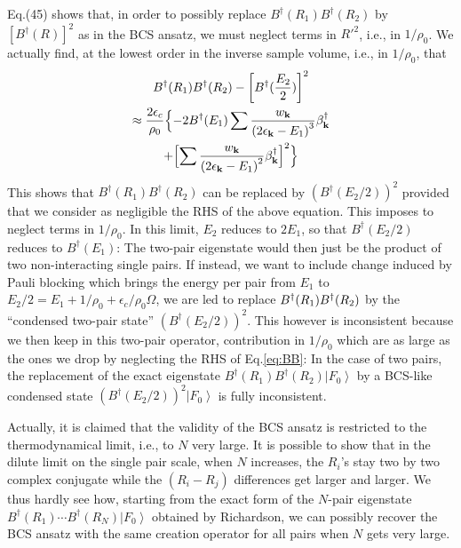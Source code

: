 \documentclass[aps,prb,superscriptaddress,showpacs,reprint,lengthcheck]{revtex4-1}
\newcommand{\vk}{\ensuremath{\mathbf{k}}}
\begin{document}
Eq.(45) shows that, in order to possibly replace $B^{\dagger}(R_1)B^{\dagger}(R_2)$ by $\left[B^{\dagger}(R)\right]
^2$ as in the BCS ansatz, we must neglect terms in $R'^2$, i.e., in $1/\rho_0$. We  actually find, at the lowest order in the inverse sample volume, i.e., in $1/\rho_0$, that
\begin{multline}  \label{eq:BB}
B^{\dagger}(R_1)B^{\dagger}(R_2)-\left[B^{\dagger}(\frac{E _2}{2})%
\right] ^2 \\
\approx \frac{2\epsilon_c}{\rho_0}\Bigl\{-2B^{\dagger}(E _1)\sum\frac{w_\vk}{\left(2\epsilon_\vk-%
E _1\right) ^3}\beta^{\dagger}_\vk\\ +\Bigl[\sum\frac{w_\vk}{%
\left(2\epsilon_\vk-E _1\right) ^2}\beta^{\dagger}_\vk\Bigr]
^2\Bigr\}  
\end{multline}
This shows that $B^{\dagger}(R_1)B^{\dagger}(R_2)$ can be
replaced by $\left(B^{\dagger}(E _2/2)\right) ^2$ provided that we
consider as negligible the RHS of the above equation. This imposes to neglect terms in $1/\rho_0$. 
In this limit, $E_2$ reduces to $2E_1$, so that $B^{\dagger}(E _2/2)$  reduces to $%
B^{\dagger}(E _1)$: The
two-pair eigenstate would then just be the product of two non-interacting single pairs. If
instead, we want to include
change induced by Pauli blocking which brings the
energy per pair from $E _1$ to $E _2/2=E
_1+1/\rho_0+\epsilon_c/\rho_0\Omega$, we are led to replace $B^{\dagger}(R_1)B^{%
\dagger}(R_2)$ by the ``condensed two-pair state'' $\left(B^{\dagger}(E _2/2)\right) ^2$. This
however is inconsistent because we then keep in this two-pair
operator, contribution in $1/\rho_0$ which are as large as the ones we drop
by neglecting the RHS of Eq.\eqref{eq:BB}: In the case of two pairs, the replacement of
the exact eigenstate $B^{\dagger}(R_1)B^{\dagger}(R_2)\left|F_0\right>  $ by
a BCS-like condensed state $\left(B^{\dagger}(E _2/2)\right)
^2\left|F_0\right>  $ is fully inconsistent.

Actually, it is claimed that the validity of the BCS ansatz is restricted to the thermodynamical
limit, i.e., to $N$ very large. It is possible to show that in the dilute limit on the single pair scale, when $N$ increases, the $R_i$'s stay two by two complex conjugate while the $(R_i - R_j)$ differences get larger and larger. We thus hardly see how, 
starting from the exact form of the $N$-pair eigenstate $B^{\dagger}(R_1)\cdots{}B^{\dagger}(R_N)\left|F_0\right>  $ 
obtained by Richardson, we can possibly recover the BCS ansatz with the same 
creation operator for all  pairs when $N$ gets very large.
\end{document}
